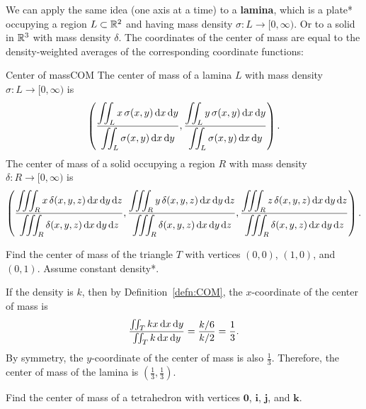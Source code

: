 \documentclass{watsonbook}
\begin{document}
We can apply the same idea (one axis at a time) to a \textbf{lamina}, which is a plate* occupying a region $L\subset \mathbb{R}^2$ and having mass density $\sigma:L \to [0,\infty)$. Or to a solid in $\mathbb{R}^3$ with mass density $\delta$. The coordinates of the center of mass are equal to the density-weighted averages of the corresponding coordinate functions: 

\begin{defn}{Center of mass}{COM}
  The {center of mass} of a lamina $L$ with mass density $\sigma:L \to [0,\infty)$ is
  \[
    \left(
      \frac{\displaystyle{\iint_L x \, \sigma(x,y) \, \mathrm{d}x \, \mathrm{d}y}}
      {\displaystyle{\iint_L \sigma(x,y) \, \mathrm{d}x \, \mathrm{d}y}},
      \frac{\displaystyle{\iint_L y \, \sigma(x,y) \, \mathrm{d}x \, \mathrm{d}y}}
      {\displaystyle{\iint_L \sigma(x,y) \, \mathrm{d}x \, \mathrm{d}y}}
    \right). 
  \]
    The center of mass of a solid occupying a region $R$ with mass density $\delta:R \to [0,\infty)$ is
  \[
    \left(
      \frac{\displaystyle{\iiint_R x \, \delta(x,y,z) \, \mathrm{d}x \, \mathrm{d}y \, \mathrm{d}z}}
      {\displaystyle{\iiint_R \delta(x,y,z) \, \mathrm{d}x \, \mathrm{d}y \, \mathrm{d}z}},
      \frac{\displaystyle{\iiint_R y \, \delta(x,y,z) \, \mathrm{d}x \, \mathrm{d}y \, \mathrm{d}z}}
      {\displaystyle{\iiint_R \delta(x,y,z) \, \mathrm{d}x \, \mathrm{d}y \, \mathrm{d}z}},
      \frac{\displaystyle{\iiint_R z \, \delta(x,y,z) \, \mathrm{d}x \, \mathrm{d}y \, \mathrm{d}z}}
      {\displaystyle{\iiint_R \delta(x,y,z) \, \mathrm{d}x \, \mathrm{d}y \, \mathrm{d}z}}
    \right). 
  \]
\end{defn}

\begin{example}{}{}
  Find the center of mass of the triangle $T$ with vertices $(0,0)$, $(1,0)$, and $(0,1)$. Assume constant density*. 
\end{example}

\begin{solution}
  If the density is $k$, then by Definition~\ref{defn:COM}, the $x$-coordinate of the center of mass is
  \[
    \frac{\iint_T kx \, \mathrm{d} x \, \mathrm{d} y}{\iint_T k \, \mathrm{d} x \, \mathrm{d} y}  =\frac{k/6}{k/2} = \frac{1}{3}. 
  \]
  By symmetry, the $y$-coordinate of the center of mass is also $\tfrac{1}{3}$. Therefore, the center of mass of the lamina is $\boxed{\left(\tfrac{1}{3}, \tfrac{1}{3}\right)}$. 
\end{solution}

\begin{exercise}{}{}
  Find the center of mass of a tetrahedron with vertices $\mathbf{0}$, $\mathbf{i}$, $\mathbf{j}$, and $\mathbf{k}$. 
\end{exercise}
\end{document}
